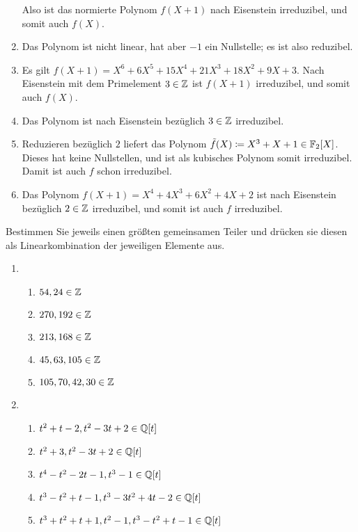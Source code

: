 \begin{solution}
\begin{enumerate}
      Also ist das normierte Polynom $f(X+1)$ nach Eisenstein irreduzibel, und somit auch $f(X)$.
    \item
      Das Polynom ist nicht linear, hat aber $-1$ ein Nullstelle; es ist also reduzibel.
    \item
      Es gilt $f(X+1) = X^6 + 6 X^5 + 15 X^4 + 21 X^3 + 18 X^2 + 9 X + 3$.
      Nach Eisenstein mit dem Primelement $3 \in \mathbb{Z}$ ist $f(X+1)$ irreduzibel, und somit auch $f(X)$.
    \item
      Das Polynom ist nach Eisenstein bezüglich $3 \in \mathbb{Z}$ irreduzibel.
    \item
      Reduzieren bezüglich $2$ liefert das Polynom $\tilde{f}(X) \coloneqq X^3 + X + 1 \in \mathbb{F}_2[X]$.
      Dieses hat keine Nullstellen, und ist als kubisches Polynom somit irreduzibel.
      Damit ist auch $f$ schon irreduzibel.
    \item
      Das Polynom $f(X+1) = X^4 + 4 X^3 + 6 X^2 + 4 X + 2$ ist nach Eisenstein bezüglich $2 \in \mathbb{Z}$ irreduzibel, und somit ist auch $f$ irreduzibel.
  \end{enumerate}
\end{solution}


\begin{question}[subtitle = Größte gemeinsame Teiler]
  Bestimmen Sie jeweils einen größten gemeinsamen Teiler und drücken sie diesen als Linearkombination der jeweiligen Elemente aus.
  \begin{enumerate}
    \item
      \begin{enumerate}
        \item
          $54, 24 \in \mathbb{Z}$
        \item
          $270, 192 \in \mathbb{Z}$
        \item
          $213, 168 \in \mathbb{Z}$
        \item
          $45, 63, 105 \in \mathbb{Z}$
        \item
          $105, 70, 42, 30 \in \mathbb{Z}$
      \end{enumerate}
    \item
      \begin{enumerate}
        \item
          $t^2 + t - 2, t^2 - 3 t + 2 \in \mathbb{Q}[t]$
        \item
          $t^2 + 3, t^2 - 3 t + 2 \in \mathbb{Q}[t]$
        \item
          $t^4 - t^2 - 2 t - 1, t^3 - 1 \in \mathbb{Q}[t]$
        \item
          $t^3 - t^2 + t - 1, t^3 - 3 t^2 + 4 t - 2 \in \mathbb{Q}[t]$
        \item
          $t^3 + t^2 + t + 1, t^2 - 1, t^3 - t^2 + t - 1 \in \mathbb{Q}[t]$
      \end{enumerate}
  \end{enumerate}
\end{question}


